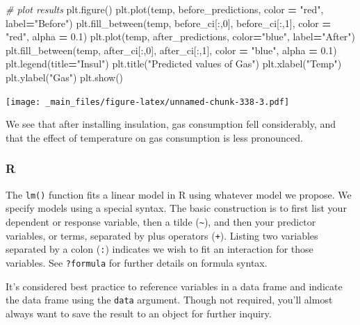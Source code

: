 \documentclass[
]{book}
\newenvironment{Shaded}{\begin{snugshade}}{\end{snugshade}}
\newcommand{\CommentTok}[1]{\textcolor[rgb]{0.56,0.35,0.01}{\textit{#1}}}
\newcommand{\DecValTok}[1]{\textcolor[rgb]{0.00,0.00,0.81}{#1}}
\newcommand{\FloatTok}[1]{\textcolor[rgb]{0.00,0.00,0.81}{#1}}
\newcommand{\NormalTok}[1]{#1}
\newcommand{\OperatorTok}[1]{\textcolor[rgb]{0.81,0.36,0.00}{\textbf{#1}}}
\newcommand{\StringTok}[1]{\textcolor[rgb]{0.31,0.60,0.02}{#1}}
\begin{document}
\begin{Shaded}
\begin{Highlighting}[]
\CommentTok{\# plot results}
\NormalTok{plt.figure()}
\NormalTok{plt.plot(temp, before\_predictions, color }\OperatorTok{=} \StringTok{"red"}\NormalTok{, label}\OperatorTok{=}\StringTok{"Before"}\NormalTok{)}
\NormalTok{plt.fill\_between(temp, before\_ci[:,}\DecValTok{0}\NormalTok{], before\_ci[:,}\DecValTok{1}\NormalTok{], color }\OperatorTok{=} \StringTok{"red"}\NormalTok{, alpha }\OperatorTok{=} \FloatTok{0.1}\NormalTok{)}
\NormalTok{plt.plot(temp, after\_predictions, color}\OperatorTok{=}\StringTok{"blue"}\NormalTok{, label}\OperatorTok{=}\StringTok{"After"}\NormalTok{)}
\NormalTok{plt.fill\_between(temp, after\_ci[:,}\DecValTok{0}\NormalTok{], after\_ci[:,}\DecValTok{1}\NormalTok{], color }\OperatorTok{=} \StringTok{"blue"}\NormalTok{, alpha }\OperatorTok{=} \FloatTok{0.1}\NormalTok{)}
\NormalTok{plt.legend(title}\OperatorTok{=}\StringTok{"Insul"}\NormalTok{)}
\NormalTok{plt.title(}\StringTok{"Predicted values of Gas"}\NormalTok{)}
\NormalTok{plt.xlabel(}\StringTok{"Temp"}\NormalTok{)}
\NormalTok{plt.ylabel(}\StringTok{"Gas"}\NormalTok{)}
\NormalTok{plt.show()}
\end{Highlighting}
\end{Shaded}

\texttt{[image: \_main\_files/figure-latex/unnamed-chunk-338-3.pdf]}

We see that after installing insulation, gas consumption fell considerably, and that the effect of temperature on gas consumption is less pronounced.

\hypertarget{r-49}{%
\subsubsection*{R}\label{r-49}}

The \texttt{lm()} function fits a linear model in R using whatever model we propose. We specify models using a special syntax. The basic construction is to first list your dependent or response variable, then a tilde (\texttt{\textasciitilde{}}), and then your predictor variables, or terms, separated by plus operators (\texttt{+}). Listing two variables separated by a colon (\texttt{:}) indicates we wish to fit an interaction for those variables. See \texttt{?formula} for further details on formula syntax.

It's considered best practice to reference variables in a data frame and indicate the data frame using the \texttt{data} argument. Though not required, you'll almost always want to save the result to an object for further inquiry.
\end{document}
